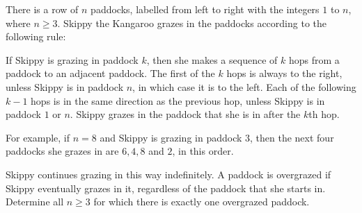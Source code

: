 There is a row of $n$ paddocks, labelled from left to right with the integers $1$ to $n$, where $n\geq 3$. Skippy the Kangaroo grazes in the paddocks according to the following rule:

If Skippy is grazing in paddock $k$, then she makes a sequence of $k$ hops from a paddock to an adjacent paddock. The first of the $k$ hops is always to the right, unless Skippy is in paddock $n$, in which case it is to the left. Each of the following $k-1$ hops is in the same direction as the previous hop, unless Skippy is in paddock $1$ or $n$. Skippy grazes in the paddock that she is in after the $k$th hop.

For example, if $n=8$ and Skippy is grazing in paddock $3$, then the next four paddocks she grazes in are $6,4,8$ and $2$, in this order.

Skippy continues grazing in this way indefinitely. A paddock is overgrazed if Skippy eventually grazes in it, regardless of the paddock that she starts in. Determine all $n\geq 3$ for which there is exactly one overgrazed paddock.
